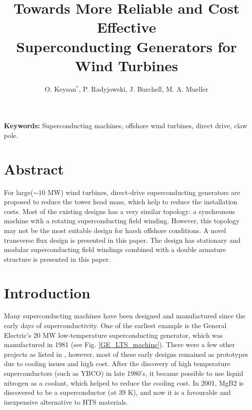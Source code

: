 \documentclass[12pt]{IET02}
\begin{document}
\title{Towards More Reliable and Cost Effective \\Superconducting Generators for Wind Turbines}


\author{O. Keysan$^{*}$, P. Radyjowski, J. Burchell, M. A. Mueller}

\address{\textit{Institute for Energy Systems, University of Edinburgh, United Kingdom}\\
$^{*}$\textit{Email: o.keysan@ed.ac.uk}}



\twocolumn

\maketitle

\textbf{Keywords:} Superconducting machines, offshore wind turbines, direct drive, claw pole.


\section*{Abstract}

 For large($\sim$10 MW) wind turbines, direct-drive superconducting generators are proposed to reduce the tower head mass, which help to reduce the installation costs. Most of the existing designs has a very similar topology: a synchronous machine with a rotating superconducting field winding. However, this topology may not be the most suitable design for harsh offshore conditions. A novel transverse flux design is presented in this paper. The design has stationary and modular superconducting field windings combined with a double armature structure is presented in this paper.

\vspace{0.5pc}

\section{Introduction}

Many superconducting machines have been designed and manufactured since the early days of superconductivity. One of the earliest example is the General Electric's 20 MW low-temperature superconducting generator, which was manufactured in 1981 (see Fig. \ref{GE_LTS_machine}). There were a few other projects as listed in \cite{Barnes2005}, however, most of these early designs remained as prototypes due to cooling issues and high cost. After the discovery of high temperature superconductors (such as YBCO) in late 1980's, it became possible to use liquid nitrogen as a coolant, which helped to reduce the cooling cost. In 2001, MgB2 is discovered to be a superconductor (at 39 K), and now it is a favourable and inexpensive alternative to HTS materials.
\end{document}
